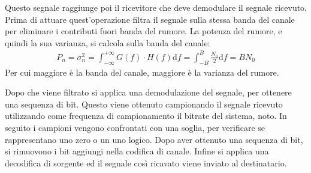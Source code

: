 \documentclass{article}
\newcommand{\df}{\mathrm{d}}
\numberwithin{equation}{subsection}
\begin{document}
Questo segnale raggiunge poi il ricevitore che deve demodulare il segnale ricevuto. Prima di attuare quest'operazione filtra il segnale sulla stessa banda del canale per 
eliminare i contributi fuori banda del rumore. La potenza del rumore, e quindi la sua varianza, si calcola sulla banda del canale:
\begin{gather*}
    P_n=\sigma_n^2=\displaystyle\int_{-\infty}^{+\infty}G(f)\cdot H(f)\df f=\int_{-B}^B\frac{N_0}{2}\df f=BN_0
\end{gather*}
Per cui maggiore è la banda del canale, maggiore è la varianza del rumore. 

Dopo che viene filtrato si applica una demodulazione del segnale, per ottenere una sequenza di bit. Questo viene ottenuto campionando il segnale ricevuto utilizzando 
come frequenza di campionamento il bitrate del sistema, noto. In seguito i campioni vengono confrontati con una soglia, per verificare se rappresentano uno zero o un uno 
logico. 
Dopo aver ottenuto una sequenza di bit, si rimuovono i bit aggiungi nella codifica di canale. Infine si applica una decodifica di sorgente ed il segnale così ricavato 
viene inviato al destinatario. 
\end{document}
